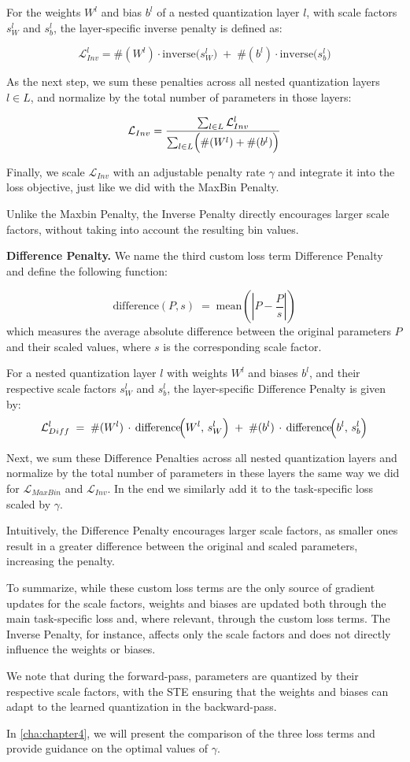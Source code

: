 For the weights \( W^l \) and bias \( b^l \) of a nested quantization layer \( l \), 
with scale factors \( s_W^l \) and \( s_b^l \), the layer-specific inverse penalty is defined as:

\[
\mathcal{L}_{Inv}^l 
= 
\#(W^l) \cdot \text{inverse}\!\bigl(s_W^l\bigr)
\;+\;
\#(b^l) \cdot \text{inverse}\!\bigl(s_b^l\bigr)
\]

As the next step, we sum these penalties across all nested quantization layers \( l \in L \),
and normalize by the total number of parameters in those layers:

\[
\mathcal{L}_{Inv}
=
\frac{\sum_{l \in L} \mathcal{L}_{Inv}^l}{\sum_{l \in L} \Bigl(\#(W^l) + \#(b^l)\Bigr)}
\]

Finally, we scale \( \mathcal{L}_{Inv} \) with an adjustable penalty rate \( \gamma \)
and integrate it into the loss objective, just like we did with the MaxBin Penalty.

Unlike the Maxbin Penalty, the Inverse Penalty directly encourages larger scale factors,
without taking into account the resulting bin values.


\textbf{Difference Penalty.}
We name the third custom loss term Difference Penalty and define the following function:

\[
\mathrm{difference}(P, s) 
\;=\;
\mathrm{mean}\!\left(\left| P - \frac{P}{s} \right|\right)
\]
which measures the average absolute difference between the original parameters \(P\) and their scaled values, where \(s\) is the corresponding scale factor.

For a nested quantization layer \(l\) with weights \(W^l\) and biases \(b^l\), and their respective scale factors \(s_W^l\) and \(s_b^l\), the layer-specific Difference Penalty is given by:
\[
\mathcal{L}_{Diff}^l
\;=\;
\#(W^l)\,\cdot\,
\mathrm{difference}\!\Bigl(W^l,\,s_W^l\Bigr)
\;+\;
\#(b^l)\,\cdot\,
\mathrm{difference}\!\Bigl(b^l,\,s_b^l\Bigr)
\]

Next, we sum these Difference Penalties across all nested quantization layers and normalize by the total number of parameters in these layers the 
same way we did for \( \mathcal{L}_{MaxBin} \) and \(\mathcal{L}_{Inv} \).
In the end we similarly add it to the task-specific loss scaled by \( \gamma \).

Intuitively, 
the Difference Penalty encourages larger scale factors,
as smaller ones result in a greater difference between the original and scaled parameters, 
increasing the penalty.

To summarize, while these custom loss terms are the only source of gradient updates for the scale factors,
weights and biases are updated both through the main task-specific loss and, where relevant, through the custom loss terms.
The Inverse Penalty, for instance, affects only the scale factors and does not directly influence the weights or biases.

We note that during the forward-pass, parameters are quantized by their respective scale factors,
with the STE ensuring that the weights and biases can adapt to the learned quantization in the backward-pass.

In \cref{cha:chapter4}, we will present the comparison of the three loss terms and provide guidance on the 
optimal values of \( \gamma \).